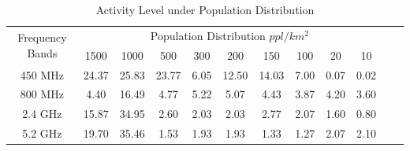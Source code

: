 \begin{table}
\centering %
\begin{tabular}{|c|c|c|c|c|c|c|c|c|c|c|c|} %
\hline %
 \multirow{2}{*}{Frequency Bands} & \multicolumn{9}{|c|}{Population Distribution $ppl/km^2$} \\
\cline{2-10}
		& 1500 & 1000 & 500 & 300 &  200 & 150 & 100 & 20 & 10 \\ %
\hline %
450 MHz &24.37	&25.83  &23.77	&6.05 &12.50  &14.03 & 7.00 & 0.07 & 0.02 \\      
\hline %
800 MHz &4.40 	&16.49  &4.77	&5.22&5.07 &4.43  & 3.87 & 4.20 & 3.60 \\      
\hline %
2.4 GHz &15.87 	&34.95  &2.60	&2.03&2.03 &2.77  & 2.07 & 1.60 & 0.80 \\      
\hline %
5.2 GHz &19.70	&35.46  &1.53	&1.93&1.93 &1.33  & 1.27 & 2.07 & 2.10 \\      
\hline %
\end{tabular}    
\caption{Activity Level under Population Distribution} %
\label{tab:activitymeasurement}    
\vspace{-0.2in}
\end{table}    

